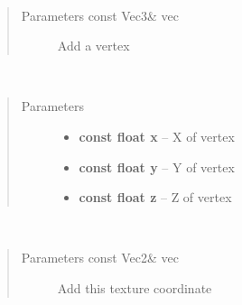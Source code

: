 \documentclass[letterpaper,10pt,english]{sphinxmanual}
\begin{document}

\begin{fulllineitems}
\label{gl:VertexData::addVertex__Vec3CR}~\begin{quote}\begin{description}
\item[{Parameters const Vec3\& vec}] \leavevmode
Add a vertex

\end{description}\end{quote}

\end{fulllineitems}


\begin{fulllineitems}
\label{gl:VertexData::addVertex__floatC.floatC.floatC}~\begin{quote}\begin{description}
\item[{Parameters}] \leavevmode\begin{itemize}
\item {} 
\textbf{const float x} -- X of vertex

\item {} 
\textbf{const float y} -- Y of vertex

\item {} 
\textbf{const float z} -- Z of vertex

\end{itemize}

\end{description}\end{quote}

\end{fulllineitems}


\begin{fulllineitems}
\label{gl:VertexData::addTexCoord__Vec2CR}~\begin{quote}\begin{description}
\item[{Parameters const Vec2\& vec}] \leavevmode
Add this texture coordinate

\end{description}\end{quote}

\end{fulllineitems}
\end{document}
